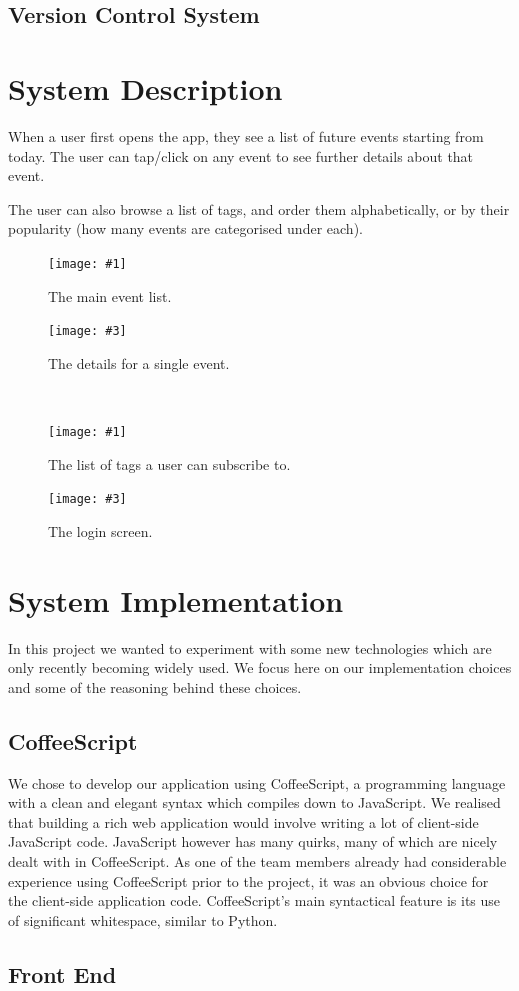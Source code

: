 \documentclass[11pt]{article}
\newcommand{\twofigure}[4]{
\begin{minipage}{0.45\textwidth}
    \centering
    \texttt{[image: \#1]}
    \caption{#2}
\end{minipage}
\begin{minipage}{0.45\textwidth}
    \centering
    \texttt{[image: \#3]}
    \caption{#4}
\end{minipage}
}
\begin{document}
\subsection {Version Control System}

\section {System Description}

When a user first opens the app, they see a list of future events starting from today. The user can tap/click on any event to see further details about that event.

The user can also browse a list of tags, and order them alphabetically, or by their popularity (how many events are categorised under each).


\begin{figure}
\twofigure{images/event-list.png}{The main event list.}{images/event-detail.png}{The details for a single event.}
\\[2em]
\twofigure{images/tag-list.png}{The list of tags a user can subscribe to.}{images/login.png}{The login screen.}
\end{figure}

\section {System Implementation}

In this project we wanted to experiment with some new technologies which are only recently becoming widely used. We focus here on our implementation choices and some of the reasoning behind these choices.

\subsection{CoffeeScript}
We chose to develop our application using CoffeeScript, a programming language with a clean and elegant syntax which compiles down to JavaScript. We realised that building a rich web application would involve writing a lot of client-side JavaScript code. JavaScript however has many quirks, many of which are nicely dealt with in CoffeeScript. As one of the team members already had considerable experience using CoffeeScript prior to the project, it was an obvious choice for the client-side application code. CoffeeScript's main syntactical feature is its use of significant whitespace, similar to Python.

\subsection {Front End}
\end{document}
